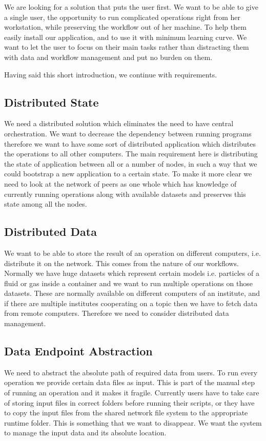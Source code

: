 We are looking for a solution that puts the user first.
We want to be able to give a single user, the opportunity to run complicated operations right
from her workstation, while preserving the workflow out of her machine.
To help them easily install our application, and to use it with minimum learning curve.
We want to let the user to focus on their main tasks rather than distracting them with 
data and workflow management and put no burden on them.

Having said this short introduction, we continue with requirements.

\subsection{Distributed State}
We need a distributed solution which eliminates the need to have central orchestration.
We want to decrease the dependency between running programs therefore we want to have 
some sort of distributed application which distributes the operations to all other computers.
The main requirement here is distributing the state of application between all or a number of nodes, 
in such a way that we could bootstrap a new application to a certain state. To make it more clear
we need to look at the network of peers as one whole which has knowledge of currently running
operations along with available datasets and preserves this state among all the nodes.

\subsection{Distributed Data}
We want to be able to store the result of an operation on different computers, i.e. distribute it on the network.
This comes from the nature of our workflows. Normally we have huge datasets which represent certain models i.e.
particles of a fluid or gas inside a container and we want to run multiple operations on those datasets. These
are normally available on different computers of an institute, and if there are multiple institutes cooperating
on a topic then we have to fetch data from remote computers. Therefore we need to consider distributed data management.

\subsection{Data Endpoint Abstraction}
We need to abstract the absolute path of required data from users. To run every operation
we provide certain data files as input. This is part of the manual step of running an operation and
it makes it fragile. Currently users have to take care of storing input files in correct folders before
running their scripts, or they have to copy the input files from the shared network file system to the
appropriate runtime folder. This is something that we want to disappear. We want the system to 
manage the input data and its absolute location.

